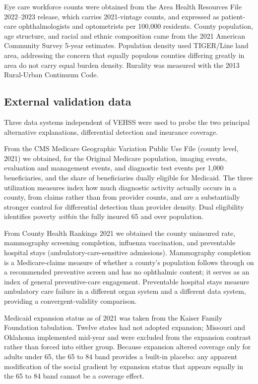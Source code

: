 \documentclass[11pt]{article}
\begin{document}
Eye care workforce counts were obtained from the Area Health Resources File
2022--2023 release, which carries 2021-vintage counts,\citep{ahrf} and expressed
as patient-care ophthalmologists and optometrists per 100,000 residents. County
population, age structure, and racial and ethnic composition came from the 2021
American Community Survey 5-year estimates. Population density used TIGER/Line
land area, addressing the concern that equally populous counties differing
greatly in area do not carry equal burden density. Rurality was measured with
the 2013 Rural-Urban Continuum Code.

\subsection{External validation data}

Three data systems independent of VEHSS were used to probe the two principal
alternative explanations, differential detection and insurance coverage.

From the CMS Medicare Geographic Variation Public Use File (county level,
2021)\citep{cmsgeo}
we obtained, for the Original Medicare population, imaging events, evaluation
and management events, and diagnostic test events per 1,000 beneficiaries, and
the share of beneficiaries dually eligible for Medicaid. The three utilization
measures index how much diagnostic activity actually occurs in a county, from
claims rather than from provider counts, and are a substantially stronger
control for differential detection than provider density. Dual eligibility
identifies poverty \emph{within} the fully insured 65 and over population.

From County Health Rankings 2021\citep{chr} we obtained the county uninsured rate,
mammography screening completion, influenza vaccination, and preventable
hospital stays (ambulatory-care-sensitive admissions). Mammography completion is
a Medicare-claims measure of whether a county's population follows through on a
recommended preventive screen and has no ophthalmic content; it serves as an
index of general preventive-care engagement. Preventable hospital stays measure
ambulatory care failure in a different organ system and a different data system,
providing a convergent-validity comparison.

Medicaid expansion status as of 2021 was taken from the Kaiser Family Foundation
tabulation.\citep{kff} Twelve states had not adopted expansion; Missouri and Oklahoma
implemented mid-year and were excluded from the expansion contrast rather than
forced into either group. Because expansion altered coverage only for adults
under 65, the 65 to 84 band provides a built-in placebo: any apparent
modification of the social gradient by expansion status that appears equally in
the 65 to 84 band cannot be a coverage effect.
\end{document}
